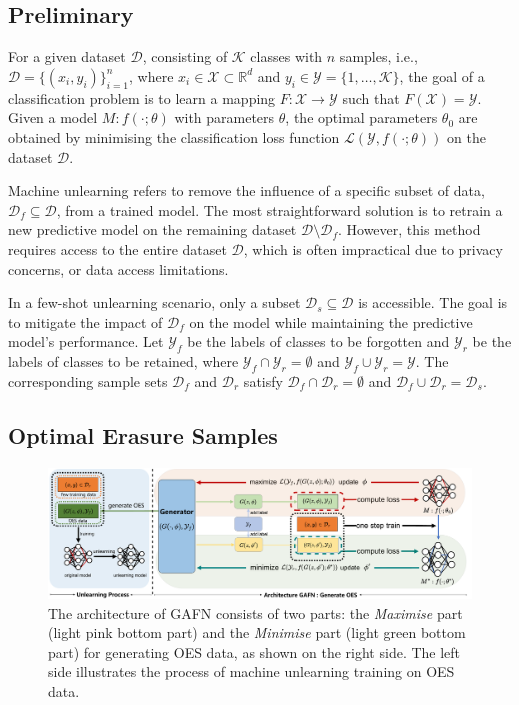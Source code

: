 \documentclass[preprint,12pt]{elsarticle}
\begin{document}
\subsection{Preliminary}
For a given dataset $\mathcal{D}$, consisting of $\mathcal{K}$ classes with $n$ samples, i.e., $\mathcal{D} = \{(x_i, y_i)\}_{i=1}^n$, where $x_i \in \mathcal{X} \subset \mathbb{R}^d$ and $y_i \in \mathcal{Y} = \{1, \ldots, \mathcal{K}\}$, the goal of a classification problem is to learn a mapping $F: \mathcal{X} \rightarrow \mathcal{Y}$ such that $F(\mathcal{X}) = \mathcal{Y}$. Given a model \(M: f(\cdot; \theta)\) with parameters $\theta$, the optimal parameters $\theta_0$ are obtained by minimising the classification loss function $\mathcal{L}(\mathcal{Y}, f(\cdot; \theta))$ on the dataset $\mathcal{D}$.

Machine unlearning refers to remove the influence of a specific subset of data, $\mathcal{D}_f \subseteq \mathcal{D}$, from a trained model. The most straightforward solution is to retrain a new predictive model on the remaining dataset $\mathcal{D} \setminus \mathcal{D}_f$. However, this method requires access to the entire dataset $\mathcal{D}$, which is often impractical due to privacy concerns, or data access limitations.

In a few-shot unlearning scenario, only a subset $\mathcal{D}_s \subseteq \mathcal{D}$ is accessible. The goal is to mitigate the impact of $\mathcal{D}_f$ on the model while maintaining the predictive model's performance. Let $\mathcal{Y}_f$ be the labels of classes to be forgotten and $\mathcal{Y}_r$ be the labels of classes to be retained, where $\mathcal{Y}_f \cap \mathcal{Y}_r = \emptyset$ and $\mathcal{Y}_f \cup \mathcal{Y}_r = \mathcal{Y}$. The corresponding sample sets $\mathcal{D}_f$ and $\mathcal{D}_r$ satisfy $\mathcal{D}_f \cap \mathcal{D}_r = \emptyset$ and $\mathcal{D}_f \cup \mathcal{D}_r = \mathcal{D}_s$. 

\subsection{Optimal Erasure Samples}

% 

\begin{figure}[t]  %
    \centering
    \includegraphics[width=\textwidth]{pic2.pdf}
    \caption{The architecture of GAFN consists of two parts: the \textit{Maximise} part (light pink bottom part) and the \textit{Minimise} part (light green bottom part) for generating OES data, as shown on the right side. The left side illustrates the process of machine unlearning training on OES data. }
    \label{fig_figure2}
\end{figure}
\end{document}
